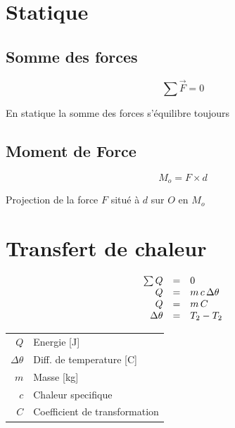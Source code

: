 \documentclass[12pt,a4paper]{article} %
\begin{document}
\newpage
\section{Statique}
\begin{twocols}
	\subsection*{Somme des forces}

	\begin{equation*}
		\sum \vec{F} = 0
	\end{equation*}

\nextcol
	
	En statique la somme des forces s'\'equilibre toujours

\end{twocols}
\begin{twocols}
	\subsection*{Moment de Force}

	\begin{equation*}
		M_o = F \times d
	\end{equation*}

\nextcol

	Projection de la force $F$ situ\'e \`a $d$ sur $O$ en $M_o$

\end{twocols}

\section{Transfert de chaleur}

\begin{twocols}
	
\begin{equation*}
	\begin{array}{r c l}
		\sum{Q} & = & 0 \\
		Q & = & m\,c\,\Delta\theta \\
		Q & = & m\,C \\
		\Delta\theta & = & T_2 - T_2 \\
	\end{array}
\end{equation*}

\nextcol

	\begin{tabular}{rl}
		$Q$ & Energie [J] \\
		$\Delta\theta$ & Diff. de temperature [C]\\
		$m$ & Masse [kg] \\
		$c$ & Chaleur specifique \\
		$C$ & Coefficient de transformation
	\end{tabular}


\end{twocols}

\end{document}
